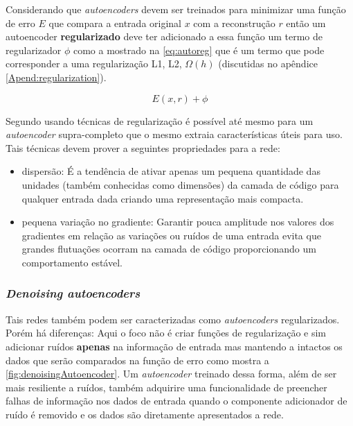 				\par Considerando que \textit{autoencoders} devem ser treinados para minimizar uma função de erro $E$ que compara a entrada original $x$ com a reconstrução $r$ então um autoencoder \textbf{regularizado} deve ter adicionado a essa função um termo de regularizador $\phi$ como a mostrado na \autoref{eq:autoreg} que é um termo que pode corresponder a uma regularização L1, L2, $\Omega(h)$ (discutidas no apêndice \autoref{Apend:regularization}).
				
				\begin{equation}
					\label{eq:autoreg}
					E(x, r) + \phi
				\end{equation}
			
				\par Segundo \cite{Goodfellow-et-al-2016} usando técnicas de regularização é possível até mesmo para um \textit{autoencoder} supra-completo que o mesmo extraia características úteis para uso. Tais técnicas devem prover a seguintes propriedades para a rede:
				
				\begin{itemize}
					\item dispersão: É a tendência de ativar apenas um pequena quantidade das unidades (também conhecidas como dimensões) da camada de código para qualquer entrada dada criando uma representação mais compacta.
					\item pequena variação no gradiente: Garantir pouca amplitude nos valores dos gradientes em relação as variações ou ruídos de uma entrada evita que grandes flutuações ocorram na camada de código proporcionando um comportamento estável.
				\end{itemize}

				
			\subsubsection{\textit{Denoising autoencoders}}
				\par Tais redes também podem ser caracterizadas como \textit{autoencoders} regularizados. Porém há diferenças: Aqui o foco não é criar funções de regularização e sim adicionar ruídos \textbf{apenas} na informação de entrada mas mantendo a intactos os dados que serão comparados na função de erro como mostra a  \autoref{fig:denoisingAutoencoder}. Um \textit{autoencoder} treinado dessa forma, além de ser mais resiliente a ruídos, também adquirire uma funcionalidade de preencher falhas de informação nos dados de entrada quando o componente adicionador de ruído é removido e os dados são diretamente apresentados a rede.
				
